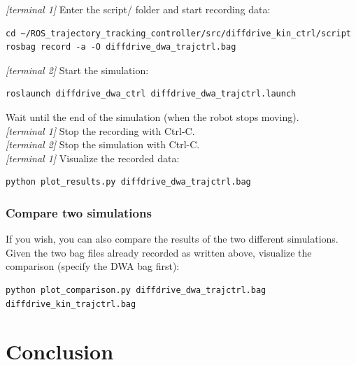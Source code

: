 \documentclass[11pt,a4paper]{article}
\begin{document}
\textit{[terminal 1]} Enter the script/ folder and start recording data:
\begin{lstlisting}
cd ~/ROS_trajectory_tracking_controller/src/diffdrive_kin_ctrl/script
rosbag record -a -O diffdrive_dwa_trajctrl.bag
\end{lstlisting}

\textit{[terminal 2]} Start the simulation:
\begin{lstlisting}
roslaunch diffdrive_dwa_ctrl diffdrive_dwa_trajctrl.launch
\end{lstlisting}

Wait until the end of the simulation (when the robot stops moving).\\

\textit{[terminal 1]} Stop the recording with Ctrl-C.\\

\textit{[terminal 2]} Stop the simulation with Ctrl-C.\\

\textit{[terminal 1]} Visualize the recorded data:
\begin{lstlisting}
python plot_results.py diffdrive_dwa_trajctrl.bag
\end{lstlisting}

\subsubsection{Compare two simulations}

If you wish, you can also compare the results of the two different simulations.\\

Given the two bag files already recorded as written above, visualize the comparison
(specify the DWA bag first):
\begin{lstlisting}
python plot_comparison.py diffdrive_dwa_trajctrl.bag diffdrive_kin_trajctrl.bag
\end{lstlisting}





\section{Conclusion}
\end{document}
